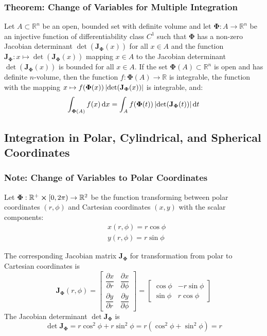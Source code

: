 \documentclass[11pt, a4paper]{article}
\newcommand{\diff}{\mathop{}\!\mathrm{d}} %
\begin{document}
\subsubsection{Theorem: Change of Variables for Multiple Integration} \label{theorm:change_of_vars}
Let $ A \subset \mathbb{R}^n $ be an open, bounded set with definite volume and let $ \bm{\Phi}: A \rightarrow \mathbb{R}^n $ be an injective function of differentiability class $ C^{1} $ such that $ \bm{\Phi} $ has a non-zero Jacobian determinant $ \det(\mathbf{J_{\Phi}}(x)) $ for all $ x \in A $ and the function $ \mathbf{J_\Phi}: x \mapsto \det(\mathbf{J_{\Phi}}(x))$ mapping $ x \in A $ to the Jacobian determinant $ \det(\mathbf{J_{\Phi}}(x)) $ is bounded for all $ x \in A $. If the set $ \bm{\Phi}(A) \subset \mathbb{R}^n $ is open and has definite $ n $-volume, then the function $ f: \bm{\Phi}(A) \rightarrow \mathbb{R} $ is integrable, the function with the mapping $ x \mapsto f(\bm{\Phi}(x)) \, \abs{\det(\mathbf{J_{\Phi}}(x))} $ is integrable, and:
\begin{equation*}
	\int_{\bm{\Phi}(A)}f(x)\diff x = \int_A f(\bm{\Phi}(t)) \,\abs{\det(\mathbf{J_{\bm{\Phi}}}(t))} \diff t
\end{equation*}

\subsection{Integration in Polar, Cylindrical, and Spherical Coordinates}

\subsubsection{Note: Change of Variables to Polar Coordinates}
Let $ \bm{\Phi} : \mathbb{R}^+ \cross [0, 2\pi) \rightarrow \mathbb{R}^2 $ be the function transforming between polar coordinates $ (r, \phi) $ and Cartesian coordinates $ (x, y) $ with the scalar components:
\begin{align*}
	& x(r, \phi) = r \cos\phi\\
	& y(r, \phi) = r \sin\phi 
\end{align*}

The corresponding Jacobian matrix $ \mathbf{J}_{\bm{\Phi}} $ for transformation from polar to Cartesian coordinates is
\[
\mathbf{J}_{\bm{\Phi}}(r, \phi) = \begin{bmatrix}
\dfrac{\partial x}{\partial r} & \dfrac{\partial x}{\partial \phi} \\[2.0ex]
\dfrac{\partial y}{\partial r} & \dfrac{\partial y}{\partial \phi}
\end{bmatrix} = 
\begin{bmatrix}
\cos \phi & -r \sin \phi \\[1.5ex]
\sin \phi & r \cos \phi
\end{bmatrix}
\]
The Jacobian determinant $ \det \mathbf{J}_{\bm{\Phi}} $ is
\begin{equation*}
 \det \mathbf{J}_{\bm{\Phi}} = r \cos^2 \phi + r \sin^2 \phi = r(\cos^2\phi + \sin^2 \phi) = r
\end{equation*}
\end{document}
